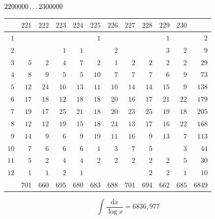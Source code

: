\clearpage
\noindent\begin{minipage}{\linewidth}\centering
{}
\(2200000\mathinner{.\,.\,.}2300000\)\par\smallskip
\begingroup\fontsize{10.5}{11.5}\selectfont\setlength{\tabcolsep}{3.5pt}\renewcommand{\arraystretch}{1}
\begin{tabular}{r|rrrrrrrrrr|r}\hline
 & $221$ & $222$ & $223$ & $224$ & $225$ & $226$ & $227$ & $228$ & $229$ & $230$ &  \\ \hline
$1$ &  &  &  &  & $1$ &  &  &  & $1$ &  & $2$ \\
$2$ &  &  & $1$ & $1$ &  & $2$ &  &  & $3$ & $2$ & $9$ \\
$3$ & $5$ & $2$ & $4$ & $7$ & $2$ & $1$ & $2$ & $2$ & $2$ & $2$ & $29$ \\
$4$ & $8$ & $9$ & $5$ & $5$ & $10$ & $7$ & $7$ & $7$ & $6$ & $9$ & $73$ \\
$5$ & $12$ & $24$ & $16$ & $13$ & $11$ & $10$ & $14$ & $14$ & $15$ & $9$ & $138$ \\
$6$ & $17$ & $18$ & $12$ & $18$ & $18$ & $20$ & $16$ & $17$ & $21$ & $22$ & $179$ \\
$7$ & $19$ & $17$ & $25$ & $21$ & $18$ & $20$ & $23$ & $25$ & $19$ & $18$ & $205$ \\
$8$ & $12$ & $12$ & $19$ & $15$ & $18$ & $24$ & $13$ & $17$ & $16$ & $22$ & $168$ \\
$9$ & $14$ & $9$ & $6$ & $9$ & $19$ & $11$ & $16$ & $9$ & $13$ & $7$ & $113$ \\
$10$ & $7$ & $6$ & $6$ & $6$ & $1$ & $3$ & $7$ & $5$ &  & $3$ & $44$ \\
$11$ & $5$ & $2$ & $4$ & $4$ & $2$ & $2$ & $2$ & $2$ & $2$ & $5$ & $30$ \\
$12$ & $1$ & $1$ & $2$ & $1$ &  &  &  & $2$ & $2$ & $1$ & $10$ \\
\hline
 & $701$ & $660$ & $695$ & $680$ & $683$ & $688$ & $701$ & $694$ & $662$ & $685$ & $6849$ \\ \hline
\end{tabular}\par\endgroup
\setlength{\abovedisplayskip}{6pt}\setlength{\belowdisplayskip}{4pt}
\[\int\frac{\mathrm{d}x}{\log x}=6836{,}977\]
\end{minipage}\par

